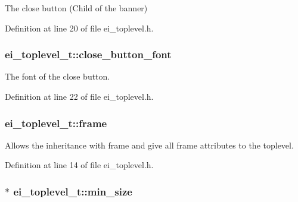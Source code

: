 The close button (Child of the banner) 



Definition at line 20 of file ei\+\_\+toplevel.\+h.

\hypertarget{structei__toplevel__t_aec35a67c16125a0aa3adf345f1c597a9}{
\subsubsection[{close\+\_\+button\+\_\+font}]{ ei\+\_\+toplevel\+\_\+t\+::close\+\_\+button\+\_\+font}}\label{structei__toplevel__t_aec35a67c16125a0aa3adf345f1c597a9}


The font of the close button. 



Definition at line 22 of file ei\+\_\+toplevel.\+h.

\hypertarget{structei__toplevel__t_a03509f8ae2983cc3777569d7e10deae6}{
\subsubsection[{frame}]{ ei\+\_\+toplevel\+\_\+t\+::frame}}\label{structei__toplevel__t_a03509f8ae2983cc3777569d7e10deae6}


Allows the inheritance with frame and give all frame attributes to the toplevel. 



Definition at line 14 of file ei\+\_\+toplevel.\+h.

\hypertarget{structei__toplevel__t_a0eda3e2e2012df72477221731a6c2bd3}{
\subsubsection[{min\+\_\+size}]{$\ast$ ei\+\_\+toplevel\+\_\+t\+::min\+\_\+size}}\label{structei__toplevel__t_a0eda3e2e2012df72477221731a6c2bd3}


